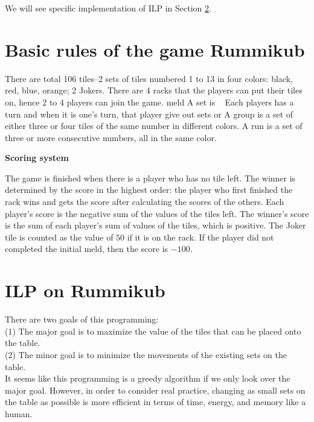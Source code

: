 \documentclass[11pt]{article}
\begin{document}
	
	We will see specific implementation of ILP in Section \ref{section-ILP imp}.
	
	
	
	\section{Basic rules of the game Rummikub}\label{section-rules}
	
	There are total 106 tiles--2 sets of tiles numbered 1 to 13 in four colors: black, red, blue, orange; 2 Jokers. There are 4 racks that the players can put their tiles on, hence 2 to 4 players can join the game.
	meld
	A set is ~
	Each players has a turn and when it is one's turn, that player give out sets or 
	A group is a set of either three or four tiles of the same number in different colors.
	A run is a set of three or more consecutive numbers, all in the same color.
	
	\textbf{Scoring system}
	
	The game is finished when there is a player who has no tile left.
	The winner is determined by the score in the highest order: the player who first finished the rack wins and gets the score after calculating the scores of the others. Each player's score is the negative sum of the values of the tiles left. The winner's score is the sum of each player's sum of values of the tiles, which is positive. The Joker tile is counted as the value of $50$ if it is on the rack. If the player did not completed the initial meld, then the score is $-100$.
	
	
	\section{ILP on Rummikub}\label{section-ILP imp}
	
	There are two goals of this programming:\\
	(1) The major goal is to maximize the value of the tiles that can be placed onto the table.\\
	(2) The minor goal is to minimize the movements of the existing sets on the table.\\
	It seems like this programming is a greedy algorithm if we only look over the major goal. However, in order to consider real practice, changing as small sets on the table as possible is more efficient in terms of time, energy, and memory like a human.\\
	
\end{document}
